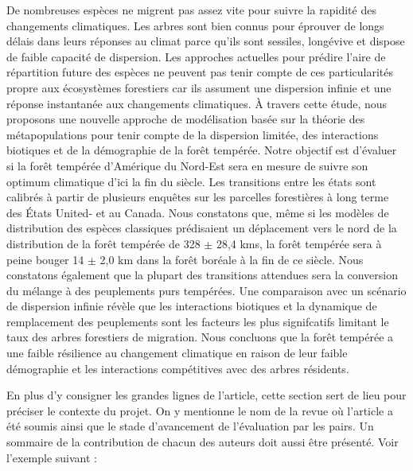De nombreuses espèces ne migrent pas assez vite pour suivre la rapidité des changements climatiques. Les arbres sont bien connus pour éprouver de longs délais dans leurs réponses au climat parce qu'ils sont sessiles, longévive et dispose de faible capacité de dispersion. Les approches actuelles pour prédire l'aire de répartition future des espèces ne peuvent pas tenir compte de ces particularités propre aux écosystèmes forestiers car ils assument une dispersion infinie et une réponse instantanée aux changements climatiques. À travers cette étude, nous proposons une nouvelle approche de modélisation basée sur la théorie des métapopulations pour tenir compte de la dispersion limitée, des interactions biotiques et de la démographie de la forêt tempérée. Notre objectif est d'évaluer si la forêt tempérée d'Amérique du Nord-Est sera en mesure de suivre son optimum climatique d'ici la fin du siècle. Les transitions entre les états sont calibrés à partir de plusieurs enquêtes sur les parcelles forestières à long terme des États United- et au Canada. Nous constatons que, même si les modèles de distribution des espèces classiques prédisaient un déplacement vers le nord de la distribution de la forêt tempérée de 328 $\pm$ 28,4 kms, la forêt tempérée sera à peine bouger 14 $\pm $ 2,0 km dans la forêt boréale à la fin de ce siècle. Nous constatons également que la plupart des transitions attendues sera la conversion du mélange à des peuplements purs tempérées. Une comparaison avec un scénario de dispersion infinie révèle que les interactions biotiques et la dynamique de remplacement des peuplements sont les facteurs les plus signifcatifs limitant le taux des arbres forestiers de migration. Nous concluons que la forêt tempérée a une faible résilience au changement climatique en raison de leur faible démographie et les interactions compétitives avec des arbres résidents.

En plus d’y consigner les grandes lignes de l’article, cette section sert de lieu pour préciser le contexte du projet. On y mentionne le nom de la revue où l’article a été soumis ainsi que le stade d’avancement de l’évaluation par les pairs. Un sommaire de la contribution de chacun des auteurs doit aussi être présenté. Voir l’exemple suivant :

